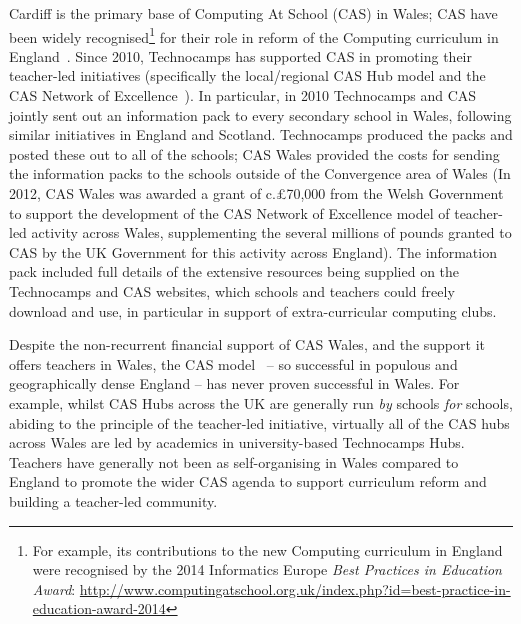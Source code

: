 \documentclass{llncs}
\begin{document}
Cardiff is the primary base of Computing At School (CAS) in Wales; CAS
have been widely recognised\footnote{For example, its contributions to the new
Computing curriculum in England were recognised by the 2014
Informatics Europe {\emph{Best Practices in Education Award}}:
\url{http://www.computingatschool.org.uk/index.php?id=best-practice-in-education-award-2014}}
for their role in reform of the Computing curriculum in
England~\cite{brown-et-al-toce2014}. Since 2010, Technocamps has
supported CAS in promoting their teacher-led initiatives (specifically
the local/regional CAS Hub model and the CAS Network of
Excellence~\cite{brown-et-al-toce2014,sentance-et-al-wipsce2014}).
In particular, in 2010 Technocamps and CAS jointly sent out an
information pack to every secondary school in Wales, following similar
initiatives in England and Scotland. Technocamps produced the packs
and posted these out to all of the schools; CAS Wales provided the
costs for sending the information packs to the schools outside of the
Convergence area of Wales (In 2012, CAS Wales was awarded a grant of c.\pounds70,000
from the Welsh Government to support the development of the CAS Network of
Excellence model of teacher-led activity across Wales, supplementing
the several millions of pounds granted to CAS by the UK Government for
this activity across England).  The information pack included full
details of the extensive resources being supplied on the Technocamps
and CAS websites, which schools and teachers could freely download and
use, in particular in support of extra-curricular computing clubs.

 

Despite the non-recurrent financial support of CAS Wales, and the
support it offers teachers in Wales, the CAS
model~\cite{sentance-et-al:2014} -- so successful in populous and
geographically dense England -- has never proven successful in Wales.
For example, whilst CAS Hubs across the UK are generally run \emph{by}
schools \emph{for} schools, abiding to the principle of the
teacher-led initiative, virtually all of the CAS hubs across Wales are
led by academics in university-based Technocamps Hubs.
Teachers have generally not been as self-organising in Wales compared
to England to promote the wider CAS agenda to support
curriculum reform and building a teacher-led community.
\end{document}
